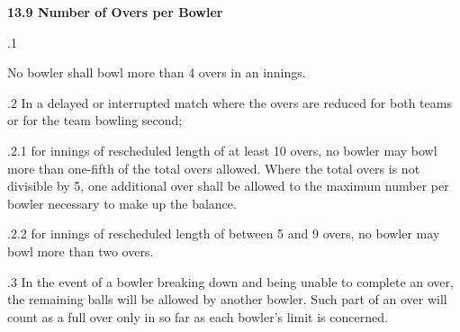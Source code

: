 \documentclass[12pt]{article}
\begin{document}
\vspace{\baselineskip}
{\fontsize{11pt}{13.2pt}\selectfont \textbf{13.9 \tabto{0.47in} Number of Overs per Bowler}\par}\par


\vspace{\baselineskip}
{\fontsize{9pt}{10.8pt}.1 \tabto{0.49in} {\fontsize{8pt}{9.6pt}\selectfont No bowler shall bowl more than 4 overs in an innings.\par}\par}\par


\vspace{\baselineskip}
\begin{adjustwidth}{0.5in}{0.4in}
{\fontsize{9pt}{10.8pt}.2 \tabto{0.49in} In a delayed or interrupted match where the overs are reduced for both teams or for the team bowling second;\par}\par

\end{adjustwidth}


\vspace{\baselineskip}
\begin{adjustwidth}{1.18in}{0.01in}
{\fontsize{9pt}{10.8pt}.2.1 \tabto{1.17in} for innings of rescheduled length of at least 10 overs, no bowler may bowl more than one-fifth of the total overs allowed. Where the total overs is not divisible by 5, one additional over shall be allowed to the maximum number per bowler necessary to make up the balance.\par}\par

\end{adjustwidth}


\vspace{\baselineskip}
\begin{adjustwidth}{1.18in}{0.07in}
{\fontsize{9pt}{10.8pt}.2.2 \tabto{1.17in} for innings of rescheduled length of between 5 and 9 overs, no bowler may bowl more than two overs.\par}\par

\end{adjustwidth}


\vspace{\baselineskip}
\begin{adjustwidth}{0.5in}{0.1in}
{\fontsize{9pt}{10.8pt}.3 \tabto{0.49in} In the event of a bowler breaking down and being unable to complete an over, the remaining balls will be allowed by another bowler. Such part of an over will count as a full over only in so far as each bowler’s limit is concerned.\par}\par

\end{adjustwidth}
\end{document}
